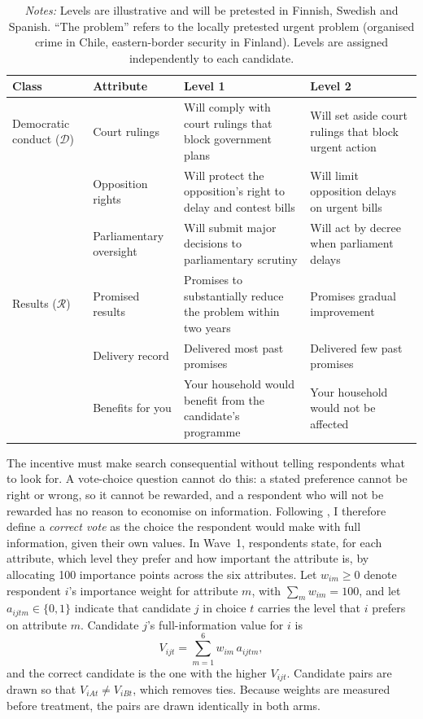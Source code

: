 \documentclass[11pt]{article}
\newcommand{\Dem}{\mathcal{D}}
\newcommand{\Res}{\mathcal{R}}
\begin{document}
\begin{table}[!htbp]
\centering
\caption{Hidden attributes and planned levels}
\label{tab:attributes}
\footnotesize
\begin{tabularx}{\textwidth}{p{2.0cm} p{2.6cm} X X}
\toprule
\textbf{Class} & \textbf{Attribute} & \textbf{Level 1} & \textbf{Level 2} \\
\midrule
Democratic conduct ($\Dem$) & Court rulings & Will comply with court rulings that block government plans & Will set aside court rulings that block urgent action \\
 & Opposition rights & Will protect the opposition's right to delay and contest bills & Will limit opposition delays on urgent bills \\
 & Parliamentary oversight & Will submit major decisions to parliamentary scrutiny & Will act by decree when parliament delays \\
\midrule
Results ($\Res$) & Promised results & Promises to substantially reduce the problem within two years & Promises gradual improvement \\
 & Delivery record & Delivered most past promises & Delivered few past promises \\
 & Benefits for you & Your household would benefit from the candidate's programme & Your household would not be affected \\
\bottomrule
\end{tabularx}
\caption*{\footnotesize\textit{Notes:} Levels are illustrative and will be pretested in Finnish, Swedish and Spanish. ``The problem'' refers to the locally pretested urgent problem (organised crime in Chile, eastern-border security in Finland). Levels are assigned independently to each candidate.}
\end{table}

The incentive must make search consequential without telling respondents what to look for. A vote-choice question cannot do this: a stated preference cannot be right or wrong, so it cannot be rewarded, and a respondent who will not be rewarded has no reason to economise on information. Following \textcite{LauRedlawsk1997}, I therefore define a \emph{correct vote} as the choice the respondent would make with full information, given their own values. In Wave~1, respondents state, for each attribute, which level they prefer and how important the attribute is, by allocating 100 importance points across the six attributes. Let $w_{im}\geq 0$ denote respondent $i$'s importance weight for attribute $m$, with $\sum_m w_{im}=100$, and let $a_{ijtm}\in\{0,1\}$ indicate that candidate $j$ in choice $t$ carries the level that $i$ prefers on attribute $m$. Candidate $j$'s full-information value for $i$ is
\[
V_{ijt}=\sum_{m=1}^{6} w_{im}\,a_{ijtm},
\]
and the correct candidate is the one with the higher $V_{ijt}$. Candidate pairs are drawn so that $V_{iAt}\neq V_{iBt}$, which removes ties. Because weights are measured before treatment, the pairs are drawn identically in both arms.
\end{document}
